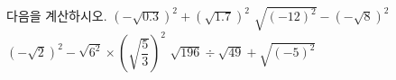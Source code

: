 다음을 계산하시오.
 $(-\sqrt{0.3})^2+(\sqrt{1.7})^2$
 $\sqrt{(-12)^2}-(-\sqrt{8})^2$
 $(-\sqrt{2})^2-\sqrt{6^2}\times\left(\sqrt{\dfrac{5}{3}}\right)^2$
 $\sqrt{196}\div\sqrt{49}+\sqrt{(-5)^2}$
